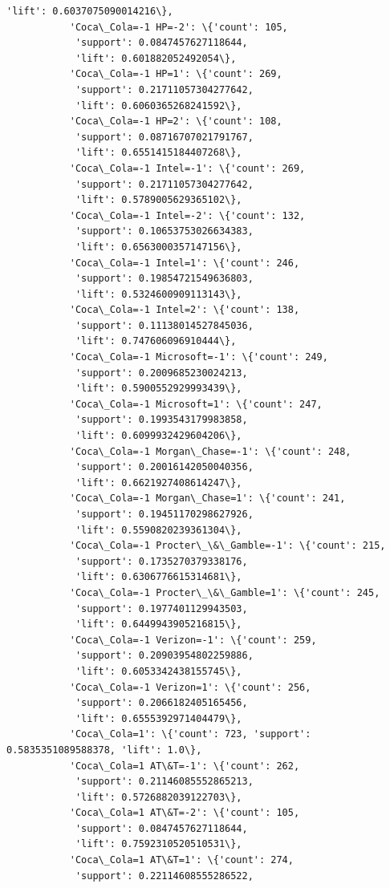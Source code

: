 \documentclass[11pt]{article}
\begin{document}
\begin{Verbatim}[commandchars=\\\{\}]
            'lift': 0.6037075090014216\},
           'Coca\_Cola=-1 HP=-2': \{'count': 105,
            'support': 0.0847457627118644,
            'lift': 0.601882052492054\},
           'Coca\_Cola=-1 HP=1': \{'count': 269,
            'support': 0.21711057304277642,
            'lift': 0.6060365268241592\},
           'Coca\_Cola=-1 HP=2': \{'count': 108,
            'support': 0.08716707021791767,
            'lift': 0.6551415184407268\},
           'Coca\_Cola=-1 Intel=-1': \{'count': 269,
            'support': 0.21711057304277642,
            'lift': 0.5789005629365102\},
           'Coca\_Cola=-1 Intel=-2': \{'count': 132,
            'support': 0.10653753026634383,
            'lift': 0.6563000357147156\},
           'Coca\_Cola=-1 Intel=1': \{'count': 246,
            'support': 0.19854721549636803,
            'lift': 0.5324600909113143\},
           'Coca\_Cola=-1 Intel=2': \{'count': 138,
            'support': 0.11138014527845036,
            'lift': 0.747606096910444\},
           'Coca\_Cola=-1 Microsoft=-1': \{'count': 249,
            'support': 0.2009685230024213,
            'lift': 0.5900552929993439\},
           'Coca\_Cola=-1 Microsoft=1': \{'count': 247,
            'support': 0.1993543179983858,
            'lift': 0.6099932429604206\},
           'Coca\_Cola=-1 Morgan\_Chase=-1': \{'count': 248,
            'support': 0.20016142050040356,
            'lift': 0.6621927408614247\},
           'Coca\_Cola=-1 Morgan\_Chase=1': \{'count': 241,
            'support': 0.19451170298627926,
            'lift': 0.5590820239361304\},
           'Coca\_Cola=-1 Procter\_\&\_Gamble=-1': \{'count': 215,
            'support': 0.1735270379338176,
            'lift': 0.6306776615314681\},
           'Coca\_Cola=-1 Procter\_\&\_Gamble=1': \{'count': 245,
            'support': 0.1977401129943503,
            'lift': 0.6449943905216815\},
           'Coca\_Cola=-1 Verizon=-1': \{'count': 259,
            'support': 0.20903954802259886,
            'lift': 0.6053342438155745\},
           'Coca\_Cola=-1 Verizon=1': \{'count': 256,
            'support': 0.2066182405165456,
            'lift': 0.6555392971404479\},
           'Coca\_Cola=1': \{'count': 723, 'support': 0.5835351089588378, 'lift': 1.0\},
           'Coca\_Cola=1 AT\&T=-1': \{'count': 262,
            'support': 0.21146085552865213,
            'lift': 0.5726882039122703\},
           'Coca\_Cola=1 AT\&T=-2': \{'count': 105,
            'support': 0.0847457627118644,
            'lift': 0.7592310520510531\},
           'Coca\_Cola=1 AT\&T=1': \{'count': 274,
            'support': 0.22114608555286522,

\end{Verbatim}
\end{document}
